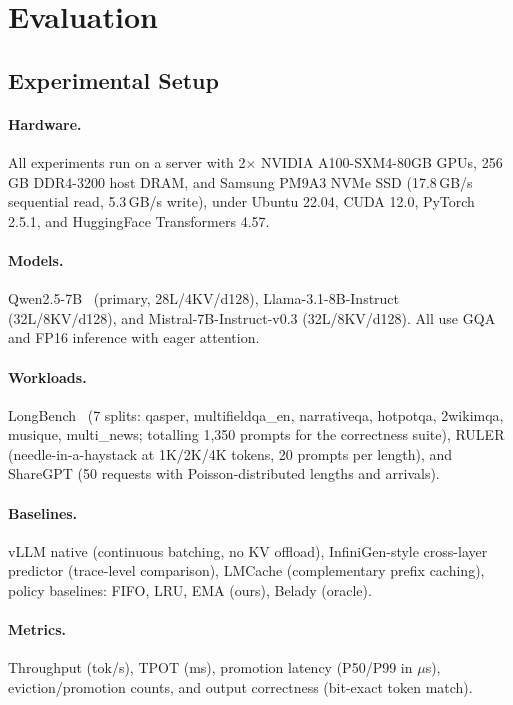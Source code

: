 \documentclass[acmsmall,nonacm,screen]{acmart}
\begin{document}
\section{Evaluation}\label{sec:eval}

\subsection{Experimental Setup}\label{sec:eval:setup}

\paragraph{Hardware.}
All experiments run on a server with 2$\times$ NVIDIA A100-SXM4-80GB GPUs,
256\,GB DDR4-3200 host DRAM, and Samsung PM9A3 NVMe SSD (17.8\,GB/s
sequential read, 5.3\,GB/s write), under Ubuntu 22.04, CUDA 12.0,
PyTorch 2.5.1, and HuggingFace Transformers 4.57.

\paragraph{Models.}
Qwen2.5-7B~\cite{yang2025qwen25} (primary, 28L/4KV/d128),
Llama-3.1-8B-Instruct~\cite{grattafiori2024llama3} (32L/8KV/d128), and
Mistral-7B-Instruct-v0.3 (32L/8KV/d128).  All use GQA and FP16 inference
with eager attention.

\paragraph{Workloads.}
LongBench~\cite{bai2024longbench} (7 splits: qasper, multifieldqa\_en,
narrativeqa, hotpotqa, 2wikimqa, musique, multi\_news; totalling 1{,}350
prompts for the correctness suite), RULER~\cite{hsieh2024ruler}
(needle-in-a-haystack at 1K/2K/4K tokens, 20 prompts per length), and
ShareGPT (50 requests with Poisson-distributed lengths and arrivals).

\paragraph{Baselines.}
vLLM native (continuous batching, no KV offload),
InfiniGen-style cross-layer predictor (trace-level comparison),
LMCache (complementary prefix caching),
policy baselines: FIFO, LRU, EMA (ours), Belady (oracle).

\paragraph{Metrics.}
Throughput (tok/s), TPOT (ms), promotion latency (P50/P99 in $\mu$s),
eviction/promotion counts, and output correctness (bit-exact token match).
\end{document}

